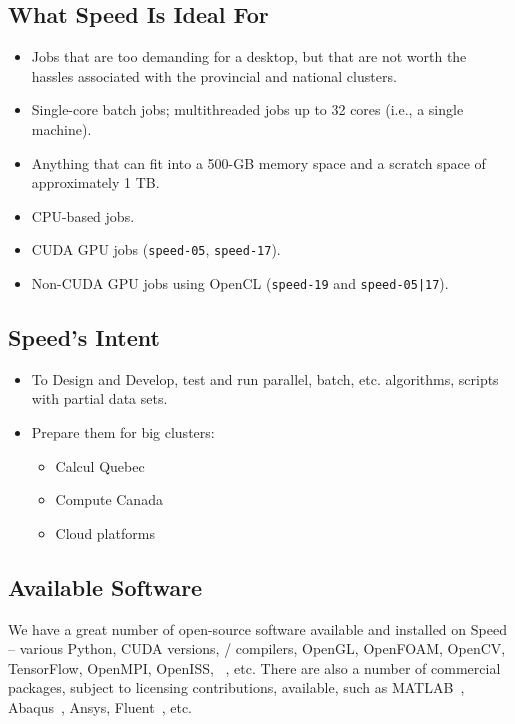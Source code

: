 \documentclass{easychair}
\begin{document}
\subsection{What Speed Is Ideal For}

\begin{itemize}
\item
Jobs that are too demanding for a desktop, but that are not worth the hassles associated with the provincial and national clusters. 
\item
Single-core batch jobs; multithreaded jobs up to 32 cores (i.e., a single machine).
\item
Anything that can fit into a 500-GB memory space and a scratch space of approximately 1 TB. 
\item
CPU-based jobs. 
\item
CUDA GPU jobs (\texttt{speed-05}, \texttt{speed-17}).
\item
Non-CUDA GPU jobs using OpenCL (\texttt{speed-19} and \texttt{speed-05|17}).
\end{itemize}

\subsection{Speed's Intent}

\begin{itemize}
	\item 
To Design and Develop, test and run parallel, batch, etc. algorithms, scripts with partial data sets.
	\item 
Prepare them for big clusters:
\begin{itemize}
	\item 
Calcul Quebec
	\item 
Compute Canada
	\item 
Cloud platforms
\end{itemize}
\end{itemize}

\subsection{Available Software}

We have a great number of open-source software available and installed
on Speed -- various Python, CUDA versions, {\cpp}/{\java} compilers, OpenGL,
OpenFOAM, OpenCV, TensorFlow, OpenMPI, OpenISS, {\marf}~\cite{marf}, etc.
There are also a number of commercial packages, subject to licensing
contributions, available, such as MATLAB~\cite{matlab,scholarpedia-matlab}, Abaqus~\cite{abaqus}, 
Ansys, Fluent~\cite{fluent}, etc. 
\end{document}
